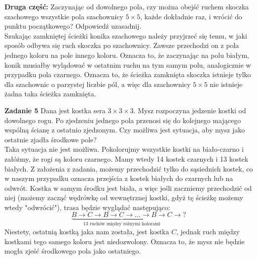 \documentclass[a4paper,12pt]{article}
\begin{document}
\noindent \textbf{Druga część:} Zaczynając od dowolnego pola, czy można obejść ruchem skoczka 
szachowego wszystkie pola szachownicy $5 \times 5$, każde dokładnie raz, i wrócić do punktu 
początkowego? Odpowiedź uzasadnij. \\

\noindent Szukając zamkniętej ścieżki konika szachowego należy przyjrzeć się temu, w jaki
sposób odbywa się ruch skoczka po szachownicy. Zawsze przechodzi on z pola jednego koloru
na pole innego koloru. Oznacza to, że zaczynając na polu białym, konik musiałby wylądować
w ostatnim ruchu na tym samym polu, analogicznie w przypadku pola czarnego. Oznacza to, 
że ścieżka zamknięta skoczka istnieje tylko dla szachownic o parzystej liczbie pól, a więc
dla szachownicy $5 \times 5$ nie istnieje żadna taka ścieżka zamknięta.

\newpage
\noindent \textbf{Zadanie 5} \newline
Dana jest kostka sera $3 \times 3 \times 3$. Mysz rozpoczyna jedzenie kostki od dowolnego
rogu. Po zjedzeniu jednego pola przenosi się do kolejnego mającego wspólną ścianę z ostatnio
zjedzonym. Czy możliwa jest sytuacja, aby mysz jako ostatnie zjadła środkowe pole? \\

\noindent Taka sytuacja nie jest możliwa. Pokolorujmy wszystkie kostki na biało-czarno 
i załóżmy, że rogi są koloru czarnego. Mamy wtedy 14 kostek czarnych i 13 kostek białych. 
Z założenia z zadania, możemy przechodzić tylko do sąsiednich kostek, co w naszym przypadku oznacza przejścia z kostek białych do czarnych lub na odwrót. Kostka w samym środku jest
biała, a więc jeśli zaczniemy przechodzić od niej (możemy zacząć wędrówkę od wewnętrznej
kostki, gdyż tę ścieżkę możemy wtedy "odwrócić"), trasa będzie wyglądać następująco:
\[
    \underbrace{B \to C \to B \to C \to \dots \to B \to C}_{\text{13 ruchów między
    różnymi kolorami}} \to {}?
\]
Niestety, ostatnią kostką jaka nam została, jest kostka $C$, jednak ruch między kostkami
tego samego koloru jest niedozwolony. Oznacza to, że mysz nie będzie mogła zjeść środkowego
pola jako ostatniego.
\end{document}
